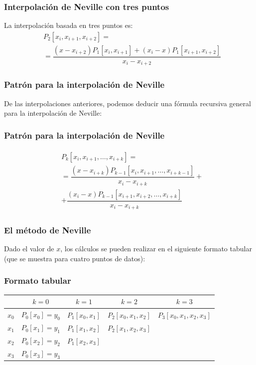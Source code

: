 \documentclass[12pt]{beamer}
\begin{document}
\begin{frame}
\frametitle{Interpolación de Neville con tres puntos}
La interpolación basada en tres puntos es:
\pause
\begin{align*}
&P_{2} [x_{i}, x_{i+1}, x_{i+2}] = \\[0.5em]
&= \dfrac{(x - x_{i+2}) P_{1} [x_{i}, x_{i+1}] + (x_{i} - x) P_{1} [x_{i+1}, x_{i+2}]}{x_{i} - x_{i+2}}
\end{align*}
\end{frame}
\begin{frame}
\frametitle{Patrón para la interpolación de Neville}
De las interpolaciones anteriores, podemos deducir una fórmula recursiva general para la interpolación de Neville:
\end{frame}
\begin{frame}
\frametitle{Patrón para la interpolación de Neville}
\begin{align}
\begin{aligned}
&P_{k} [x_{i}, x_{i+1}, \ldots, x_{i+k}] = \\[0.5em]
&= \dfrac{(x - x_{i+k}) P_{k-1} [x_{i}, x_{i+1}, \ldots, x_{i+k-1}]}{x_{i} - x_{i+k}} + \\[0.5em]
&+ \dfrac{(x_{i} - x) P_{k-1} [x_{i+1}, x_{i+2}, \ldots, x_{i+k}]}{x_{i} - x_{i+k}}
\end{aligned}
\label{eq:3_08}
\end{align}
\end{frame}
\begin{frame}
\frametitle{El método de Neville}
Dado el valor de $x$, los cálculos se pueden realizar en el siguiente formato tabular (que se muestra para cuatro puntos de datos):
\end{frame}
\begin{frame}
\frametitle{Formato tabular}
\begin{table}
\centering
\fontsize{12}{12}\selectfont
\begin{tabular}{| c | c | c | c | c |} \hline
 & $k = 0$ & $k = 1$ & $k = 2$ & $k = 3$ \\ \hline
$x_{0}$ & $P_{0} [x_{0}] = y_{0}$ & $P_{1} [x_{0}, x_{1}]$ & $P_{2} [x_{0}, x_{1}, x_{2}]$ & $P_{3} [x_{0}, x_{1}, x_{2}, x_{3}]$ \\ \hline
$x_{1}$ & $P_{0} [x_{1}] = y_{1}$ & $P_{1} [x_{1}, x_{2}]$ & $P_{2} [x_{1}, x_{2}, x_{3}]$ & \\ \hline
$x_{2}$ & $P_{0} [x_{2}] = y_{2}$ & $P_{1} [x_{2}, x_{3}]$ & & \\ \hline
$x_{3}$ & $P_{0} [x_{3}] = y_{3}$ & & & \\ \hline	
\end{tabular}
\end{table}
\end{frame}
\end{document}
